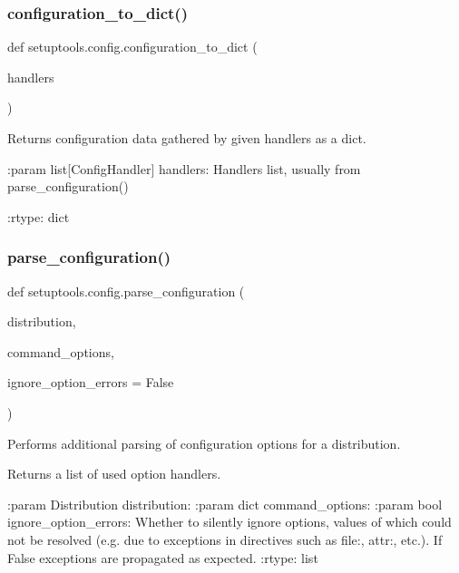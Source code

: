 \subsubsection{\texorpdfstring{configuration\+\_\+to\+\_\+dict()}{configuration\_to\_dict()}}
{\footnotesize\ttfamily def setuptools.\+config.\+configuration\+\_\+to\+\_\+dict (\begin{DoxyParamCaption}\item[{}]{handlers }\end{DoxyParamCaption})}

\begin{DoxyVerb}Returns configuration data gathered by given handlers as a dict.

:param list[ConfigHandler] handlers: Handlers list,
    usually from parse_configuration()

:rtype: dict
\end{DoxyVerb}
 \mbox{\label{namespacesetuptools_1_1config_a2c2e6e2aaa466506a52dec243e695eb6}} 
\subsubsection{\texorpdfstring{parse\+\_\+configuration()}{parse\_configuration()}}
{\footnotesize\ttfamily def setuptools.\+config.\+parse\+\_\+configuration (\begin{DoxyParamCaption}\item[{}]{distribution,  }\item[{}]{command\+\_\+options,  }\item[{}]{ignore\+\_\+option\+\_\+errors = {\ttfamily False} }\end{DoxyParamCaption})}

\begin{DoxyVerb}Performs additional parsing of configuration options
for a distribution.

Returns a list of used option handlers.

:param Distribution distribution:
:param dict command_options:
:param bool ignore_option_errors: Whether to silently ignore
    options, values of which could not be resolved (e.g. due to exceptions
    in directives such as file:, attr:, etc.).
    If False exceptions are propagated as expected.
:rtype: list
\end{DoxyVerb}
 \mbox{\label{namespacesetuptools_1_1config_a2cadac39b3e9811ccf02204b63586fc9}} 
